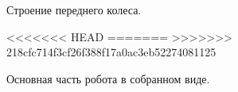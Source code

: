 \documentclass[12pt,a4paper,openany]{extarticle}
\begin{document}
\vspace{1cm}
\begin{figure}[h!]
	\caption{Строение переднего колеса.}
\end{figure}	
	
\begin{figure}[h!]
<<<<<<< HEAD
=======
>>>>>>> 218cfc714f3cf26f388f17a0ac3eb52274081125
	\caption{Основная часть робота в собранном виде.}
\end{figure}		
\end{document}
